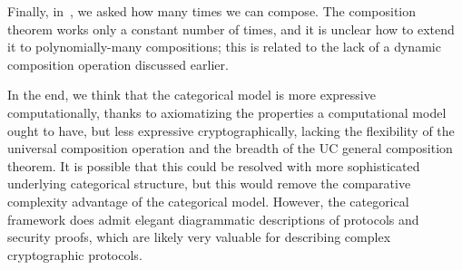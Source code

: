 Finally, in~, we asked how many times we can
compose. The composition theorem works only a constant number of times, and it
is unclear how to extend it to polynomially-many compositions; this is related
to the lack of a dynamic composition operation discussed earlier.

In the end, we think that the categorical model is more expressive
computationally, thanks to axiomatizing the properties a computational model
ought to have, but less expressive cryptographically, lacking the flexibility of
the universal composition operation and the breadth of the UC general
composition theorem. It is possible that this could be resolved with more
sophisticated underlying categorical structure, but this would remove the
comparative complexity advantage of the categorical model. However, the
categorical framework does admit elegant diagrammatic descriptions of protocols
and security proofs, which are likely very valuable for describing complex
cryptographic protocols.


